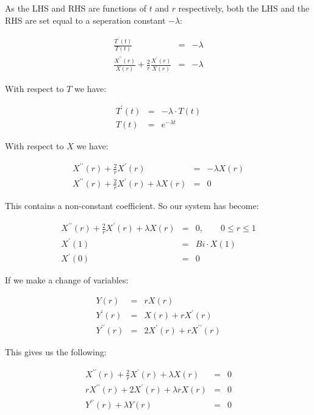 \documentclass{report}
\begin{document}
As the LHS and RHS are functions of $t$ and $r$ respectively, both the LHS and the RHS are set equal 
to a seperation constant $-\lambda$:\bigskip

\begin{eqnarray*} 
\frac{T^{\prime}(t)}{T(t)} & = & -\lambda \\
\frac{X^{\prime\prime}(r)}{X(r)} + \frac{2}{r}\frac{X^{\prime}(r)}{X(r)} & = & -\lambda
\end{eqnarray*}\medskip

With respect to $T$ we have:\bigskip

\begin{eqnarray*} 
T^{\prime}(t) & = & -\lambda \cdot T(t) \\
         T(t) & = & e^{-\lambda t}
\end{eqnarray*}\medskip

With respect to $X$ we have:\bigskip

\begin{eqnarray*} 
               X^{\prime\prime}(r) + \frac{2}{r}X^{\prime}(r) & = & -\lambda X(r) \\
X^{\prime\prime}(r) + \frac{2}{r}X^{\prime}(r) + \lambda X(r) & = & 0 
\end{eqnarray*}\medskip

This contains a non-constant coefficient. So our system has become:\bigskip

\begin{eqnarray*} 
X^{\prime\prime}(r) + \frac{2}{r}X^{\prime}(r) + \lambda X(r) & = & 0, \qquad 0 \leq r \leq 1 \\
                                                X^{\prime}(1) & = & Bi \cdot X(1) \\
                                                X^{\prime}(0) & = & 0 
\end{eqnarray*}\medskip

If we make a change of variables:

\begin{eqnarray*} 
               Y(r) & = & rX(r) \\
      Y^{\prime}(r) & = & X(r) + rX^{\prime}(r) \\
Y^{\prime\prime}(r) & = & 2X^{\prime}(r) + rX^{\prime\prime}(r) 
\end{eqnarray*}\medskip

This gives us the following:\bigskip

\begin{eqnarray*} 
X^{\prime\prime}(r) + \frac{2}{r}X^{\prime}(r) + \lambda X(r) & = & 0 \\
        rX^{\prime\prime}(r) + 2X^{\prime}(r) + \lambda rX(r) & = & 0 \\
                           Y^{\prime\prime}(r) + \lambda Y(r) & = & 0 
\end{eqnarray*}\medskip
\end{document}
